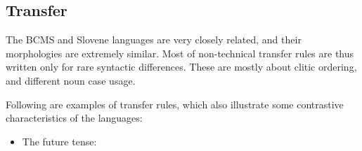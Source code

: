 \subsection{Transfer}

The BCMS and Slovene languages are very closely related, and their
morphologies are extremely similar. Most of non-technical transfer
rules are thus written only for rare syntactic differences. These are
mostly about clitic ordering, and different noun case usage.

Following are examples of transfer rules, which also illustrate some
contrastive characteristics of the languages:


\begin{itemize}
\item The future tense:
\end{itemize}







